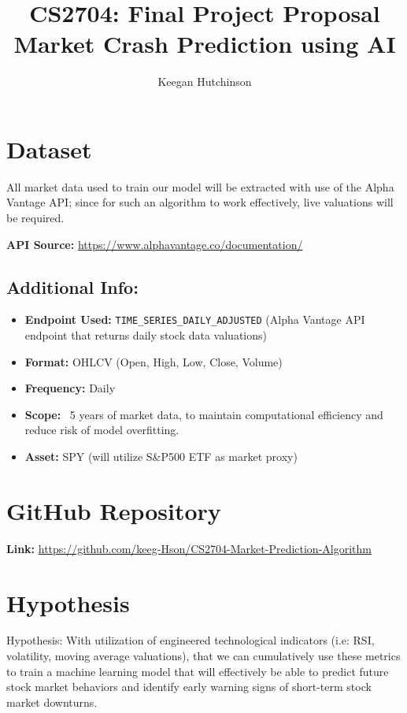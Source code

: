 \documentclass[runningheads]{llncs}
\title{CS2704: Final Project Proposal \\ Market Crash Prediction using AI}
\author{Keegan Hutchinson}
\institute{University of New Brunswick Saint John}
\begin{document}
\maketitle

\section*{Dataset}

All market data used to train our model will be extracted with use of the Alpha Vantage API; since for such an algorithm to work effectively, live valuations will be required. 

\vspace{1.0em}

\textbf{API Source:} \url{https://www.alphavantage.co/documentation/}


\subsection*{Additional Info:}
\begin{itemize}
  \item \textbf {Endpoint Used:} \texttt{TIME\_SERIES\_DAILY\_ADJUSTED} (Alpha Vantage API endpoint that returns daily stock data valuations)
  \item \textbf {Format:} OHLCV (Open, High, Low, Close, Volume)
  \item  \textbf {Frequency:} Daily
  \item  \textbf {Scope:} ~5 years of market data, to maintain computational efficiency and reduce risk of model overfitting.
  \item  \textbf {Asset:} SPY (will utilize S\&P500 ETF as market proxy)
\end{itemize}

\section*{GitHub Repository}
\textbf{Link:} \url{https://github.com/keeg-Hson/CS2704-Market-Prediction-Algorithm}

\section*{Hypothesis}
Hypothesis: With utilization of engineered technological indicators (i.e: RSI, volatility, moving average valuations), that we can cumulatively use these metrics to train a machine learning model that will effectively be able to predict future stock market behaviors and identify early warning signs of short-term stock market downturns.
\end{document}
